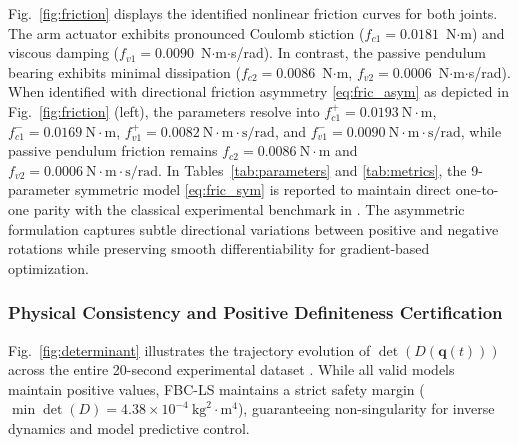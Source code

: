 \documentclass[lettersize,journal]{IEEEtran}
\begin{document}
Fig.~\ref{fig:friction} displays the identified nonlinear friction curves for both joints. The arm actuator exhibits pronounced Coulomb stiction ($f_{c1} = 0.0181$~N$\cdot$m) and viscous damping ($f_{v1} = 0.0090$~N$\cdot$m$\cdot$s/rad). In contrast, the passive pendulum bearing exhibits minimal dissipation ($f_{c2} = 0.0086$~N$\cdot$m, $f_{v2} = 0.0006$~N$\cdot$m$\cdot$s/rad). When identified with directional friction asymmetry \eqref{eq:fric_asym} as depicted in Fig.~\ref{fig:friction} (left), the parameters resolve into $f_{c1}^+ = 0.0193~\mathrm{N\cdot m}$, $f_{c1}^- = 0.0169~\mathrm{N\cdot m}$, $f_{v1}^+ = 0.0082~\mathrm{N\cdot m\cdot s/rad}$, and $f_{v1}^- = 0.0090~\mathrm{N\cdot m\cdot s/rad}$, while passive pendulum friction remains $f_{c2} = 0.0086~\mathrm{N\cdot m}$ and $f_{v2} = 0.0006~\mathrm{N\cdot m\cdot s/rad}$. In Tables~\ref{tab:parameters} and \ref{tab:metrics}, the 9-parameter symmetric model \eqref{eq:fric_sym} is reported to maintain direct one-to-one parity with the classical experimental benchmark in \cite{AguilarSierra2014}. The asymmetric formulation captures subtle directional variations between positive and negative rotations while preserving smooth differentiability for gradient-based optimization.

\subsubsection{Physical Consistency and Positive Definiteness Certification}
Fig.~\ref{fig:determinant} illustrates the trajectory evolution of $\det(D(\bm{q}(t)))$ across the entire 20-second experimental dataset \cite{AguilarSierra2014}. While all valid models maintain positive values, FBC-LS maintains a strict safety margin ($\min \det(D) = 4.38 \times 10^{-4}~\text{kg}^2\cdot\text{m}^4$), guaranteeing non-singularity for inverse dynamics and model predictive control.
\end{document}
